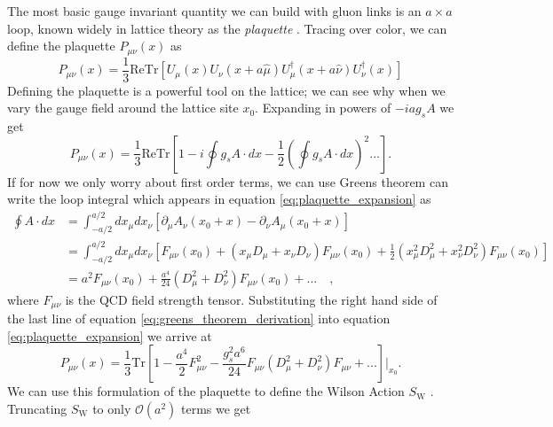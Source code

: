 The most basic gauge invariant quantity we can build with gluon links is an $a\times a$ loop, known widely in lattice theory as the \textit{plaquette} \cite{PhysRevD.10.2445, Wilson1980}.  Tracing over color, we can define the plaquette $P_{\mu\nu}(x)$ as 
\begin{equation}\label{eq:plaquette}
    P_{\mu\nu}(x) = \frac{1}{3}\mathrm{ReTr}\left[ U_\mu(x) U_\nu(x+a\hat\mu)U^\dagger_\mu(x+a\hat\nu)U^\dagger_\nu(x)
    \right]
\end{equation}
Defining the plaquette is a powerful tool on the lattice; we can see why when we vary the gauge field around the lattice site $x_0$.  Expanding in powers of $-iag_sA$ we get 
\begin{equation}\label{eq:plaquette_expansion}
    P_{\mu\nu}(x) = \frac{1}{3}\mathrm{ReTr}\left[
    1-i \oint g_sA \cdot dx - \frac{1}{2}\left( \oint g_sA \cdot dx \right)^2 ...
    \right].
\end{equation}
If for now we only worry about first order terms, we can use Greens theorem can write the loop integral which appears in equation \ref{eq:plaquette_expansion} as
\begin{equation}\label{eq:greens_theorem_derivation}
\begin{split}
    \oint A \cdot dx &= \int_{-a/2}^{a/2} dx_\mu dx_\nu \left[
    \partial_\mu A_\nu(x_0+x) -  \partial_\nu A_\mu(x_0+x)
    \right]\\
    &= \int_{-a/2}^{a/2} dx_\mu dx_\nu \left[
    F_{\mu\nu}(x_0) + (x_\mu D_\mu + x_\nu D_\nu)F_{\mu\nu}(x_0) + \frac{1}{2}
    (x_\mu^2 D_\mu^2 + x_\nu^2 D_\nu^2)F_{\mu\nu}(x_0)
    \right]
    {}\\
    &= a^2 F_{\mu\nu}(x_0) + \frac{a^4}{24}(D_\mu^2 + D_\nu^2)F_{\mu\nu}(x_0)+...\quad,
\end{split}
\end{equation}
where $F_{\mu\nu}$ is the QCD field strength tensor. Substituting the right hand side of the last line of equation \ref{eq:greens_theorem_derivation} into equation \ref{eq:plaquette_expansion} we arrive at
\begin{equation}\label{eq:plaquette_wilson}
    P_{\mu\nu}(x) = \frac{1}{3}\mathrm{Tr}\left[
    1-
   \frac{a^4}{2}F^2_{\mu\nu} - \frac{g^2_s a^6}{24}F_{\mu\nu} (D_\mu^2 + D_\nu^2)F_{\mu\nu} +...
    \right]\bigg\rvert_{x_0}   .
\end{equation}
We can use this formulation of the plaquette to define the Wilson Action $S_\mathrm{W}$ \cite{PhysRevD.10.2445}.  Truncating $S_\mathrm{W}$ to only $\mathcal{O}(a^2)$ terms we get 
